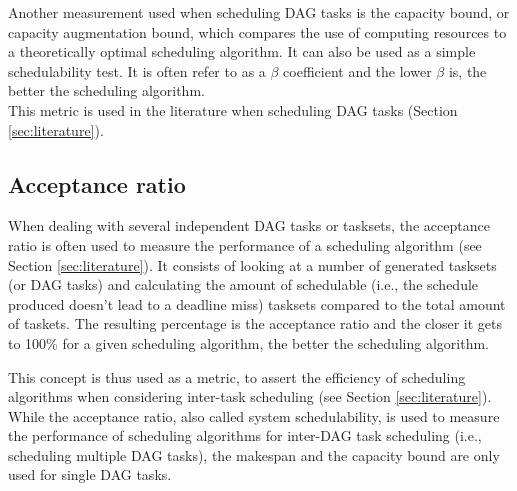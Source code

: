 Another measurement used when scheduling DAG tasks  
is the capacity bound, or capacity augmentation bound,
which compares the use of computing resources to a theoretically optimal scheduling algorithm.
It can also be used as a simple schedulability test.
It is often refer to as a $\beta$ coefficient and the lower $\beta$ is, the better the scheduling algorithm.\\
This metric is used in the literature when scheduling DAG tasks (Section \ref{sec:literature}).

%
%

\subsection{Acceptance ratio}

When dealing with several independent DAG tasks
or tasksets, 
the acceptance ratio is often used to measure the 
performance of a scheduling algorithm (see Section \ref{sec:literature}).
It consists of looking at a number of generated tasksets (or DAG tasks)
and calculating the amount of schedulable (i.e., 
the schedule produced doesn't lead to a deadline miss) tasksets compared to 
the total amount of taskets.
The resulting percentage is the acceptance ratio 
and the closer it gets to 100\% for a given scheduling algorithm, the better the scheduling algorithm.

This concept is thus used as a metric, to assert the efficiency
of scheduling algorithms when considering inter-task scheduling (see Section \ref{sec:literature}).
\\


While the acceptance ratio, also called system schedulability, is used 
to measure the performance of scheduling algorithms for inter-DAG task scheduling
(i.e., scheduling multiple DAG tasks),
the makespan and the capacity bound are only used for single DAG tasks.

